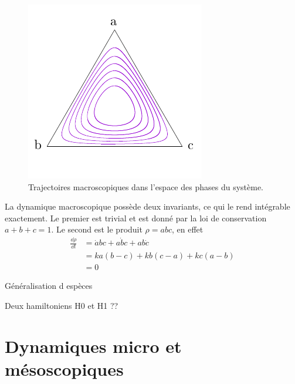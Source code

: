 \documentclass[openany,a4paper,12pt]{article}
\begin{document}
\begin{figure}
	\centering
	\includegraphics[width=0.7\linewidth]{figures/portrait}
	\caption{Trajectoires macroscopiques dans l'espace des phases du système.}
	\label{fig:portrait}
\end{figure}



\par La dynamique macroscopique possède deux invariants, ce qui le rend intégrable exactement. Le premier est trivial et est donné par la loi de conservation $a+b+c=1$. Le second est le produit $\rho = abc$, en effet
%
\begin{equation}\label{rho_invariant}
\begin{split}
	\frac{\dd \rho}{\dd t} 
	&= \dot a bc + a \dot b c + ab \dot c \\
	&= ka(b-c) + kb(c-a) + kc(a-b) \\
	&= 0
\end{split}
\end{equation}
%

{\color{red} Généralisation d espèces}

{\color{red} Deux hamiltoniens H0 et H1 ??}


\section{Dynamiques micro et mésoscopiques}
\label{section_micro}
\end{document}
